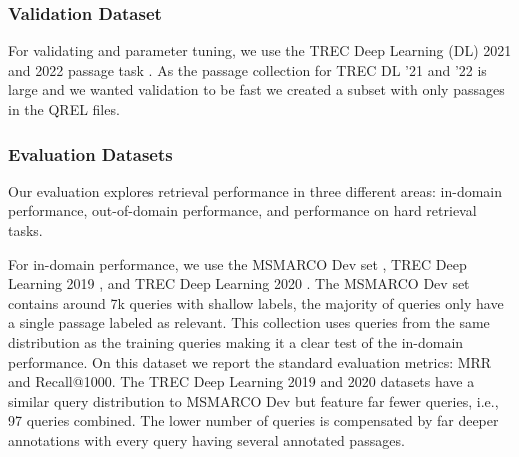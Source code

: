 \documentclass[sigconf,]{acmart}
\begin{document}
\subsubsection{Validation Dataset}
For validating and parameter tuning, we use the TREC Deep Learning (DL) 2021 \cite{TREC-DL-21} and 2022 passage task \cite{TREC-DL-21, TREC-DL-22}. As the passage collection for TREC DL '21 and '22 is large and we wanted validation to be fast we created a subset with only passages in the QREL files.

\subsubsection{Evaluation Datasets}
Our evaluation explores retrieval performance in three different areas: in-domain performance, out-of-domain performance, and performance on hard retrieval tasks.

For in-domain performance, we use the MSMARCO Dev set \cite{MSMARCO}, TREC Deep Learning 2019 \cite{TREC_DL_2019}, and TREC Deep Learning 2020 \cite{TREC_DL_2020}. The MSMARCO Dev set contains around 7k queries with shallow labels, the majority of queries only have a single passage labeled as relevant. This collection uses queries from the same distribution as the training queries making it a clear test of the in-domain performance. On this dataset we report the standard evaluation metrics: MRR and Recall@1000. The TREC Deep Learning 2019 and 2020 datasets have a similar query distribution to MSMARCO Dev but feature far fewer queries, i.e., 97 queries combined. The lower number of queries is compensated by far deeper annotations with every query having several annotated passages.


\end{document}

